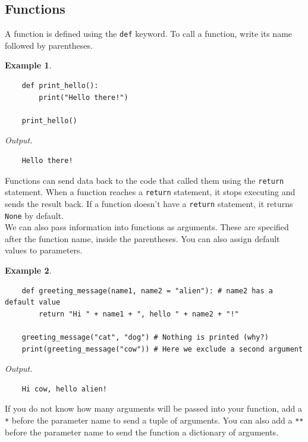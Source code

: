 \documentclass[11pt]{scrartcl}
\theoremstyle{definition}
\newtheorem*{example}{Example}
\begin{document}
\subsection{Functions}

A function is defined using the \texttt{def} keyword. To call a function, write its name followed by 
parentheses.

\begin{example}
    \
\begin{verbatim}
    def print_hello():
        print("Hello there!")
    
    print_hello()
\end{verbatim}
    \textit{Output.}
\begin{verbatim}
    Hello there!
\end{verbatim}
\end{example}

Functions can send data back to the code that called them using the \texttt{return} statement. When 
a function reaches a \texttt{return} statement, it stops executing and sends the result back. If a 
function doesn't have a \texttt{return} statement, it returns \texttt{None} by default. \\

We can also pass information into functions as arguments. These are specified after the function name, inside the 
parentheses. You can also assign default values to parameters.

\begin{example}
    \
\begin{verbatim}
    def greeting_message(name1, name2 = "alien"): # name2 has a default value
        return "Hi " + name1 + ", hello " + name2 + "!"
    
    greeting_message("cat", "dog") # Nothing is printed (why?)
    print(greeting_message("cow")) # Here we exclude a second argument
\end{verbatim}
    \textit{Output.}
\begin{verbatim}
    Hi cow, hello alien!
\end{verbatim}
\end{example}

If you do not know how many arguments will be passed into your function, add a \texttt{*} before the 
parameter name to send a tuple of arguments. You can also add a \texttt{**} before the parameter name 
to send the function a dictionary of arguments.
\end{document}
